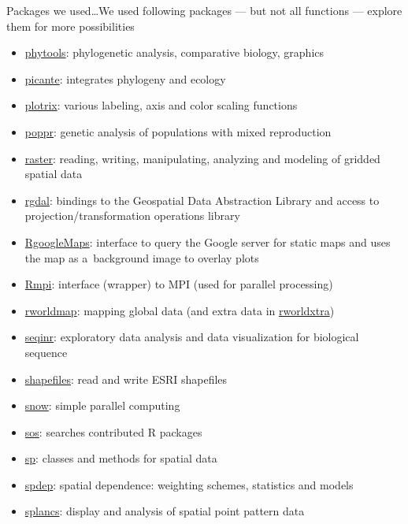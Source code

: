 \documentclass[compress, ucs, xelatex, 11pt, xcolor=svgnames,
	hyperref={
		bookmarks=true,
		unicode=true,
		colorlinks=true,
		pdftitle={Molecular data in R},
		plainpages=false,
		pdfauthor={Vojtech Zeisek},
		pdfsubject={Course about phylogeny and evolution in R},
		pdfcreator={XeLaTeX},
		pdfkeywords={R, evolution, phylogeny, molecular data},
		linkcolor=Tomato,
		anchorcolor=SaddleBrown,
		citecolor=Goldenrod,
		filecolor=DarkMagenta,
		menucolor=Sienna,
		urlcolor=DarkTurquoise,
		pdftex},
	url={hyphens, lowtilde} %
	]{beamer}
\begin{document}
\begin{frame}[allowframebreaks]{Packages we used\ldots}{We used following packages --- but not all functions --- explore them for more possibilities}
\begin{itemize}
		\item \href{https://CRAN.R-project.org/package=phytools}{phytools}: phylogenetic analysis, comparative biology, graphics
		\item \href{https://CRAN.R-project.org/package=picante}{picante}: integrates phylogeny and ecology
		\item \href{https://CRAN.R-project.org/package=plotrix}{plotrix}: various labeling, axis and color scaling functions
		\item \href{https://CRAN.R-project.org/package=poppr}{poppr}: genetic analysis of populations with mixed reproduction
		\item \href{https://CRAN.R-project.org/package=raster}{raster}: reading, writing, manipulating, analyzing and modeling of gridded spatial data
		\item \href{https://CRAN.R-project.org/package=rgdal}{rgdal}: bindings to the Geospatial Data Abstraction Library and access to projection/transformation operations library
		\item \href{https://CRAN.R-project.org/package=RgoogleMaps}{RgoogleMaps}: interface to query the Google server for static maps and uses the map as a~background image to overlay plots
		\item \href{https://CRAN.R-project.org/package=Rmpi}{Rmpi}: interface (wrapper) to MPI (used for parallel processing)
		\item \href{https://CRAN.R-project.org/package=rworldmap}{rworldmap}: mapping global data (and extra data in \href{https://CRAN.R-project.org/package=rworldxtra}{rworldxtra})
		\item \href{https://CRAN.R-project.org/package=seqinr}{seqinr}: exploratory data analysis and data visualization for biological sequence
		\item \href{https://CRAN.R-project.org/package=shapefiles}{shapefiles}: read and write ESRI shapefiles
		\item \href{https://CRAN.R-project.org/package=snow}{snow}: simple parallel computing
		\item \href{https://CRAN.R-project.org/package=sos}{sos}: searches contributed R packages
		\item \href{https://CRAN.R-project.org/package=sp}{sp}: classes and methods for spatial data
		\item \href{https://CRAN.R-project.org/package=spdep}{spdep}: spatial dependence: weighting schemes, statistics and models
		\item \href{https://CRAN.R-project.org/package=splancs}{splancs}: display and analysis of spatial point pattern data

\end{itemize}
\end{frame}
\end{document}
